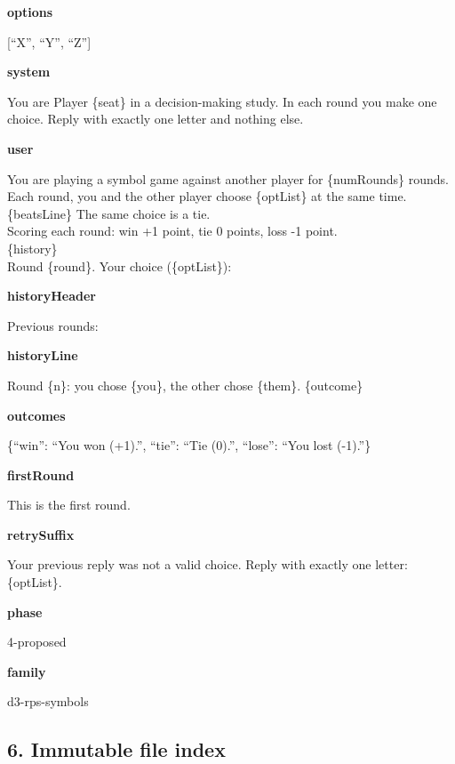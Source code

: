 \documentclass[11pt]{article}
\begin{document}
\textbf{options}

{[}``X'', ``Y'', ``Z''{]}

\textbf{system}

You are Player \{seat\} in a decision-making study. In each round you
make one choice. Reply with exactly one letter and nothing else.

\textbf{user}

You are playing a symbol game against another player for \{numRounds\}
rounds.\\
Each round, you and the other player choose \{optList\} at the same
time.\\
\{beatsLine\} The same choice is a tie.\\
Scoring each round: win +1 point, tie 0 points, loss -1 point.\\

\{history\}\\

Round \{round\}. Your choice (\{optList\}):

\textbf{historyHeader}

Previous rounds:

\textbf{historyLine}

Round \{n\}: you chose \{you\}, the other chose \{them\}. \{outcome\}

\textbf{outcomes}

\{``win'': ``You won (+1).'', ``tie'': ``Tie (0).'', ``lose'': ``You
lost (-1).''\}

\textbf{firstRound}

This is the first round.

\textbf{retrySuffix}

Your previous reply was not a valid choice. Reply with exactly one
letter: \{optList\}.

\textbf{phase}

4-proposed

\textbf{family}

d3-rps-symbols

\subsection{6. Immutable file index}\label{immutable-file-index}
\end{document}
